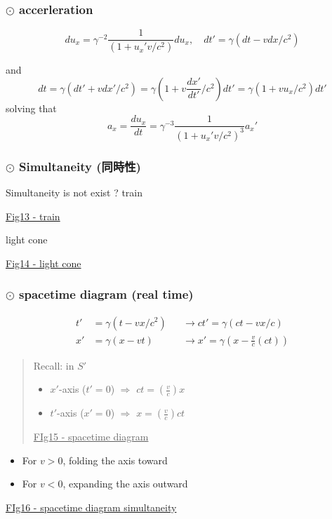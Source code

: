 \documentclass[12pt]{article}
\begin{document}
\subsubsection{$\odot$ accerleration} %


\begin{equation}
{du_x} = \gamma^{-2} \frac{1}{(1+u_x'v/c^2)} du_x
,\quad
dt' = \gamma (dt-vdx/c^2)
\end{equation}

and 
\begin{equation}
dt = \gamma (dt' + vdx'/c^2) = \gamma (1+v\frac{dx'}{dt'}/c^2) dt'
= \gamma (1+vu_x/c^2) dt'
\end{equation}
solving that 
\begin{equation}
a_x = \frac{du_x}{dt} = \gamma^{-3} \frac{1}{\left(1+u_x'v/c^2\right)^3} a_x'
\end{equation}


\subsubsection{$\odot$ Simultaneity (同時性)} %

Simultaneity is not exist ? train 

\underline{Fig13 - train}

light cone

\underline{Fig14 - light cone}

\subsubsection{$\odot$ spacetime diagram  (real time)} %


\begin{equation}
\begin{aligned}
t' &= \gamma (t-vx/c^2) &&\to ct' = \gamma (ct-vx/c)\\
x' &= \gamma (x-vt) &&\to x' = \gamma \left(x-\frac{v}{c}(ct)\right)
\end{aligned}
\end{equation}

\begin{quote}
	Recall: in $S'$
\begin{itemize}
	\item $x'$-axis ($t'=0$) $\Rightarrow$ $\displaystyle ct=\left(\frac{v}{c}\right)x$
	\item $t'$-axis ($x'=0$) $\Rightarrow$ $\displaystyle x=\left(\frac{v}{c}\right)ct$

\end{itemize}
\underline{FIg15 - spacetime diagram}

\end{quote}
\begin{itemize}
	\item For $v>0$, folding the axis toward
	\item For $v<0$, expanding the axis outward

\end{itemize}
\underline{FIg16 - spacetime diagram simultaneity}
\end{document}
